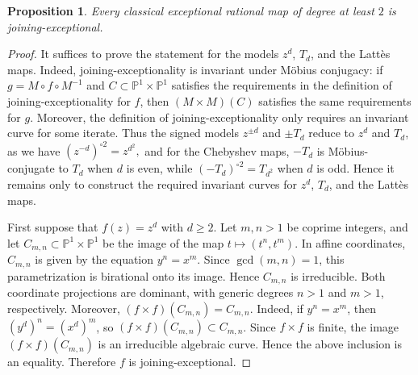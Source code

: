\documentclass[11pt]{amsart}
\numberwithin{equation}{section}
\theoremstyle{plain}
\newtheorem{prop}[thm]{Proposition}
\theoremstyle{definition}
\theoremstyle{remark}
\begin{document}
\begin{prop}\label{prop:def-dim-1}
Every classical exceptional rational map of degree at least $2$ is
joining-exceptional.
\end{prop}

\begin{proof}
It suffices to prove the statement for the models $z^d$, $T_d$, and
the Latt\`es maps. Indeed, joining-exceptionality is invariant under
M\"obius conjugacy: if $g=M\circ f\circ M^{-1}$ and
$C\subset\mathbb P^1\times\mathbb P^1$ satisfies the requirements in the definition of joining-exceptionality for $f$, then
$(M\times M)(C)$ satisfies
the same requirements for
$g$. Moreover, the definition of joining-exceptionality only requires an
invariant curve for some iterate. Thus the signed models $z^{\pm d}$ and $\pm T_d$ reduce to $z^d$ and $T_d$, as we have
$
(z^{-d})^{\circ2}=z^{d^2},
$ and for the Chebyshev maps, $-T_d$ is M\"obius-conjugate to $T_d$ when
$d$ is even, while
$
(-T_d)^{\circ2}=T_{d^2}
$
when $d$ is odd. Hence it remains only to construct the required
invariant curves for $z^d$, $T_d$, and the Latt\`es maps.

\smallskip

First suppose that $f(z)=z^d$ with $d\geq2$. Let $m,n>1$ be
coprime integers, and let $C_{m,n}\subset\mathbb P^1\times\mathbb P^1$
be the image of the map $t\mapsto (t^n,t^m)$. In affine coordinates,
$C_{m,n}$ is given by the equation $y^n=x^m$. Since $\gcd(m,n)=1$,
this parametrization is birational onto its image. Hence $C_{m,n}$ is
irreducible. Both coordinate projections are dominant, with generic
degrees $n>1$ and $m>1$, respectively. Moreover,
$(f\times f)(C_{m,n})=C_{m,n}$. Indeed, if $y^n=x^m$, then
$(y^d)^n=(x^d)^m$, so $(f\times f)(C_{m,n})\subset C_{m,n}$. Since
$f\times f$ is finite, the image $(f\times f)(C_{m,n})$ is an
irreducible algebraic curve. Hence the above inclusion is an equality.
Therefore $f$ is joining-exceptional.

\smallskip


\end{proof}
\end{document}
